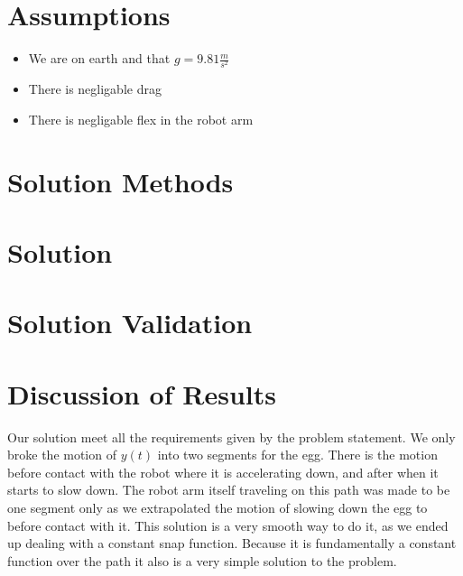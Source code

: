 \documentclass[nofoot,pdf-a,balance,upint,subscriptcorrection,varvw]{asmeconf}
\begin{document}
		\section*{Assumptions}
	
	\begin{itemize}
		\item We are on earth and that $g = 9.81 \frac{m}{s^2}$
		\item There is negligable drag
		\item There is negligable flex in the robot arm
	\end{itemize}

	\section*{Solution Methods}
	
	\section*{Solution}
	
	\section*{Solution Validation}
	
	\section*{Discussion of Results}
	
	\tab Our solution meet all the requirements given by the problem statement. We only broke the motion of $y\left(t\right)$ into two segments for the egg. There is the motion before contact with the robot where it is accelerating down, and after when it starts to slow down. The robot arm itself traveling on this path was made to be one segment only as we extrapolated the motion of slowing down the egg to before contact with it. This solution is a very smooth way to do it, as we ended up dealing with a constant snap function. Because it is fundamentally a constant function over the path it also is a very simple solution to the problem.
	
\end{document}
